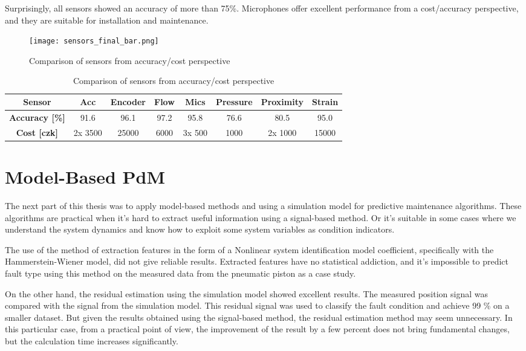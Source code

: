 Surprisingly, all sensors showed an accuracy of more than 75\%. Microphones
offer excellent performance from a cost/accuracy perspective, and they are
suitable for installation and maintenance.

\begin{figure}[h!]
    \centering
    \texttt{[image: sensors\_final\_bar.png]}
    \caption{Comparison of sensors from accuracy/cost perspective}
    \label{fig:sensors_final_bar}
\end{figure}

\begin{table}[h]
    \centering
    \begin{tabular}{|c|c|c|c|c|c|c|c|}
        \hline
        \textbf{Sensor}   & Acc & Encoder & Flow & Mics & Pressure & Proximity & Strain \\
        \hline
        \textbf{Accuracy [\%]} & 91.6 & 96.1 & 97.2 & 95.8 & 76.6 & 80.5 & 95.0 \\
        \hline
        \textbf{Cost [czk]} & 2x 3500 & 25000 & 6000 & 3x 500 & 1000 & 2x 1000 & 15000 \\
        \hline
    \end{tabular}
    \caption{Comparison of sensors from accuracy/cost perspective}
    \label{tab:sensors_final}
\end{table}

\section{Model-Based PdM}
The next part of this thesis was to apply model-based methods and using a
simulation model for predictive maintenance algorithms. These algorithms
are practical when it's hard to extract useful information using a
signal-based method. Or it's suitable in some cases where we understand
the system dynamics and know how to exploit some system variables as
condition indicators.

The use of the method of extraction features in the form of a Nonlinear
system identification model coefficient, specifically with the
Hammerstein-Wiener model, did not give reliable results. Extracted features
have no statistical addiction, and it's impossible to predict fault type
using this method on the measured data from the pneumatic piston as a case
study.

On the other hand, the residual estimation using the simulation model
showed excellent results. The measured position signal was compared with
the signal from the simulation model. This residual signal was used to
classify the fault condition and achieve  99 \% on a smaller dataset.  But
given the results obtained using the signal-based method, the residual
estimation method may seem unnecessary. In this particular case, from a
practical point of view, the improvement of the result by a few percent
does not bring fundamental changes, but the calculation time increases
significantly. 

